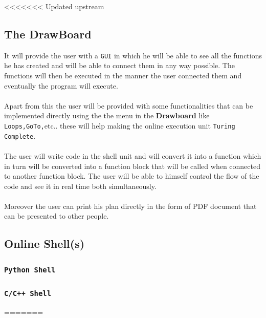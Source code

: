 \documentclass[letterpaper,10pt]{article}
\begin{document}
<<<<<<< Updated upstream
  		\subsection{The DrawBoard}
  		It will provide the user with a \texttt{GUI} in which he will be able to see all the functions he has created and will be able to connect them in any way possible. The functions will then be executed in the manner the user connected them and eventually the program will execute.
  		\\\\
  		Apart from this the user will be provided with some functionalities that can be implemented directly using the the menu in the \textbf{Drawboard} like \texttt{Loops,GoTo,}etc.. these will help making the online execution unit \texttt{Turing Complete}. \\\\
	The user will write code in the shell unit and will convert it into a function which in turn will be converted into a function block that will be called when connected to another function block. The user will be able to himself control the flow of the code and see it in real time both simultaneously.
  		\\\\
  		Moreover the user can print his plan directly in the form of PDF document that can be presented to other people. 
  		
  		\subsection{Online Shell(s)}
  		\subsubsection{\texttt{Python Shell}}
  		\blindtext
  		\subsubsection{\texttt{C/C++ Shell}}
  		\blindtext
  		\newpage
=======
\end{document}
